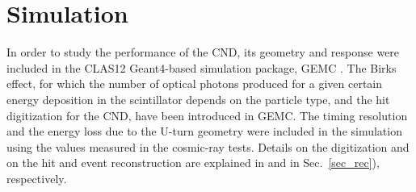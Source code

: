 \section{Simulation}
In order to study the performance of the CND, its geometry and response were included in the CLAS12 Geant4-based simulation package, GEMC \cite{sim-nim}. The Birks effect, for which the number of optical photons produced for a given certain energy deposition in the scintillator depends on the particle type, and the hit digitization for the CND, have been introduced in GEMC.
The timing resolution and the energy loss due to the U-turn geometry were included in the simulation using the values measured in the cosmic-ray tests.
Details on the digitization and on the hit and event reconstruction are explained in \cite{sim-nim} and in Sec.~\ref{sec_rec}), respectively.

